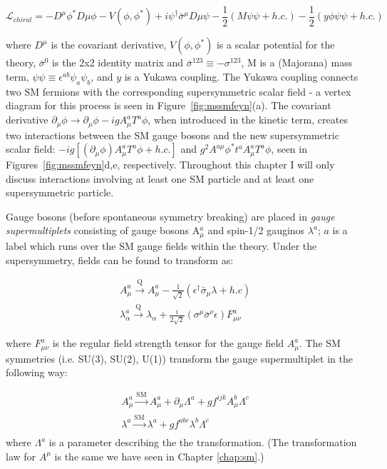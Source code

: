 \begin{equation}
\label{eq:lchiral}
\mathcal{L}_{chiral} = - D^{\mu}\phi^{*}D{\mu}\phi - V(\phi, \phi^{*}) + i \psi^{\dagger}\bar{\sigma}^{\mu} D{\mu}\psi - \frac{1}{2} (M \psi \psi + h.c.) - \frac{1}{2} (y \phi  \psi \psi + h.c.)
\end{equation}

where $D^{\mu}$ is the covariant derivative, $V(\phi, \phi^{*})$ is a scalar potential for the theory, $\bar{\sigma}^{0}$ is the 2x2 identity matrix and $\bar{\sigma}^{123}\equiv-\sigma^{123}$, M is a (Majorana) mass term, $\psi\psi\equiv\epsilon^{ab}\psi_{a}\psi_{b}$, and $y$ is a Yukawa coupling. The Yukawa coupling connects two SM fermions with the corresponding supersymmetric scalar field - a vertex diagram for this process is seen in Figure~\ref{fig:mssmfeyn}(a). The covariant derivative $\partial_{\mu} \phi \rightarrow \partial_{\mu}\phi -igA^{a}_{\mu}T^{a}\phi$, when introduced in the kinetic term, creates two interactions between the SM gauge bosons and the new supersymmetric scalar field: $-ig[(\partial_{\mu}\phi)A^{a}_{\mu}T^{a}\phi+h.c.]$ and $g^{2}A^{a\mu}\phi^{*}t^{a}A^{a}_{\mu}T^{a}\phi$, seen in Figures~\ref{fig:mssmfeyn}d,e, respectively. Throughout this chapter I will only discuss interactions involving at least one SM particle and at least one supersymmetric particle.

Gauge bosons (before spontaneous symmetry breaking) are placed in \textit{gauge supermultiplets} consisting of gauge bosons A$_{\mu}^{a}$ and spin-1/2 gauginos $\lambda^{a}$; $a$ is a label which runs over the SM gauge fields within the theory. Under the supersymmetry, fields can be found to transform as:

\begin{equation}
\begin{array}{l}
A_{\mu}^{a} \xrightarrow[]{\text{Q}} A_{\mu}^{a} - \frac{1}{\sqrt{2}} ( \epsilon^{\dagger} \bar{\sigma}_{\mu} \lambda + h.c)\\
\lambda_{\alpha}^{a} \xrightarrow[]{\text{Q}} \lambda_{\alpha} + \frac{i}{2\sqrt{2}}(\sigma^{\mu}\bar{\sigma}^{\nu}\epsilon)F_{\mu\nu}^{a}
\end{array}
\end{equation}

where $F_{\mu\nu}^{a}$ is the regular field strength tensor for the gauge field $A_{\mu}^{a}$. The SM symmetries (i.e. SU(3), SU(2), U(1)) transform the gauge supermultiplet in the following way:

\begin{equation}
\begin{array}{l}
A_{\mu}^{a} \xrightarrow[]{\text{SM}}  A_{\mu}^{a} + \partial_{\mu}\Lambda^{a} + gf^{ijk}A_{\mu}^{b}\Lambda^{c}\\
\lambda^{a} \xrightarrow[]{\text{SM}}  \lambda^{a} + gf^{abc}\lambda^{b}\Lambda^{c}
\end{array}
\end{equation}
where $\Lambda^{a}$ is a parameter describing the the transformation. (The transformation law for $A^{\mu}$ is the same we have seen in Chapter \ref{chap:sm}.)


